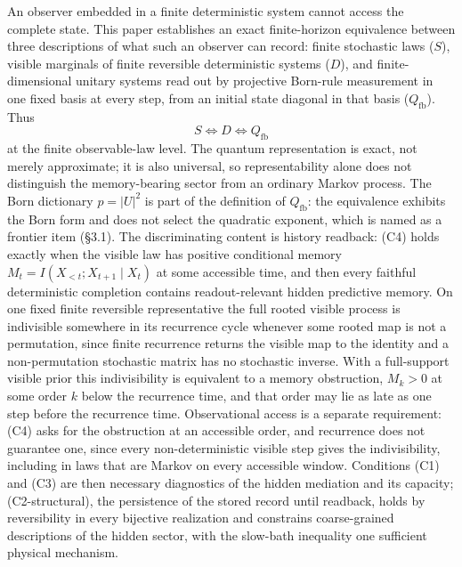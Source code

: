 \documentclass[
]{article}
\begin{document}
An observer embedded in a finite deterministic system cannot access the
complete state. This paper establishes an exact finite-horizon
equivalence between three descriptions of what such an observer can
record: finite stochastic laws (\(S\)), visible marginals of finite
reversible deterministic systems (\(D\)), and finite-dimensional unitary
systems read out by projective Born-rule measurement in one fixed basis
at every step, from an initial state diagonal in that basis
(\(Q_{\mathrm{fb}}\)). Thus \[
S\iff D\iff Q_{\mathrm{fb}}
\] at the finite observable-law level. The quantum representation is
exact, not merely approximate; it is also universal, so representability
alone does not distinguish the memory-bearing sector from an ordinary
Markov process. The Born dictionary \(p=|U|^2\) is part of the
definition of \(Q_{\mathrm{fb}}\): the equivalence exhibits the Born
form and does not select the quadratic exponent, which is named as a
frontier item (§3.1). The discriminating content is history readback:
(C4) holds exactly when the visible law has positive conditional memory
\(M_t=I(X_{<t};X_{t+1}\mid X_t)\) at some accessible time, and then
every faithful deterministic completion contains readout-relevant hidden
predictive memory. On one fixed finite reversible representative the
full rooted visible process is indivisible somewhere in its recurrence
cycle whenever some rooted map is not a permutation, since finite
recurrence returns the visible map to the identity and a non-permutation
stochastic matrix has no stochastic inverse. With a full-support visible
prior this indivisibility is equivalent to a memory obstruction,
\(M_k > 0\) at some order \(k\) below the recurrence time, and that
order may lie as late as one step before the recurrence time.
Observational access is a separate requirement: (C4) asks for the
obstruction at an accessible order, and recurrence does not guarantee
one, since every non-deterministic visible step gives the
indivisibility, including in laws that are Markov on every accessible
window. Conditions (C1) and (C3) are then necessary diagnostics of the
hidden mediation and its capacity; (C2-structural), the persistence of
the stored record until readback, holds by reversibility in every
bijective realization and constrains coarse-grained descriptions of the
hidden sector, with the slow-bath inequality one sufficient physical
mechanism.
\end{document}
